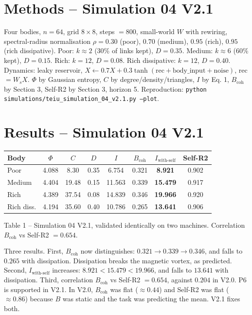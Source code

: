 \documentclass[11pt,a4paper]{article}
\begin{document}
\section{Methods -- Simulation 04 V2.1}
Four bodies, $n = 64$, grid $8 \times 8$, steps $= 800$, small-world $W$ with rewiring, spectral-radius normalisation $\rho = 0.30$ (poor), $0.70$ (medium), $0.95$ (rich), $0.95$ (rich dissipative). Poor: $k \approx 2$ (30\% of links kept), $D = 0.35$. Medium: $k \approx 6$ (60\% kept), $D = 0.15$. Rich: $k = 12$, $D = 0.08$. Rich dissipative: $k = 12$, $D = 0.40$. Dynamics: leaky reservoir, $X \leftarrow 0.7 X + 0.3 \tanh(\text{rec} + \text{body\_input} + \text{noise})$, rec $= W_s X$. $\Phi$ by Gaussian entropy, $C$ by degree/density/triangles, $I$ by Eq. 1, $B_{\text{coh}}$ by Section 3, Self-R2 by Section 3, horizon 5. Reproduction: \texttt{python simulations/teiu\_simulation\_04\_v2.1.py --plot}.

\section{Results -- Simulation 04 V2.1}
\begin{center}
\begin{tabular}{|l|c|c|c|c|c|c|c|}
\hline
Body & $\Phi$ & $C$ & $D$ & $I$ & $B_{\text{coh}}$ & $I_{\text{with-self}}$ & Self-R2 \\
\hline
Poor & 4.088 & 8.30 & 0.35 & 6.754 & 0.321 & \textbf{8.921} & 0.902 \\
Medium & 4.404 & 19.48 & 0.15 & 11.563 & 0.339 & \textbf{15.479} & 0.917 \\
Rich & 4.389 & 37.54 & 0.08 & 14.839 & 0.346 & \textbf{19.966} & 0.920 \\
Rich diss. & 4.194 & 35.60 & 0.40 & 10.786 & 0.265 & \textbf{13.641} & 0.906 \\
\hline
\end{tabular}
\end{center}
Table 1 -- Simulation 04 V2.1, validated identically on two machines. Correlation $B_{\text{coh}}$ vs Self-R2 $= 0.654$.

Three results. First, $B_{\text{coh}}$ now distinguishes: $0.321 \rightarrow 0.339 \rightarrow 0.346$, and falls to $0.265$ with dissipation. Dissipation breaks the magnetic vortex, as predicted. Second, $I_{\text{with-self}}$ increases: $8.921 < 15.479 < 19.966$, and falls to $13.641$ with dissipation. Third, correlation $B_{\text{coh}}$ vs Self-R2 $= 0.654$, against $0.204$ in V2.0. P6 is supported in V2.1. In V2.0, $B_{\text{coh}}$ was flat ($\approx 0.44$) and Self-R2 was flat ($\approx 0.86$) because $B$ was static and the task was predicting the mean. V2.1 fixes both.
\end{document}
